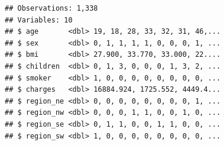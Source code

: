 \documentclass[openany]{book}
\newenvironment{Shaded}{\begin{snugshade}}{\end{snugshade}}
\newcommand{\DataTypeTok}[1]{\textcolor[rgb]{0.13,0.29,0.53}{#1}}
\newcommand{\DecValTok}[1]{\textcolor[rgb]{0.00,0.00,0.81}{#1}}
\newcommand{\FloatTok}[1]{\textcolor[rgb]{0.00,0.00,0.81}{#1}}
\newcommand{\KeywordTok}[1]{\textcolor[rgb]{0.13,0.29,0.53}{\textbf{#1}}}
\newcommand{\NormalTok}[1]{#1}
\newcommand{\OperatorTok}[1]{\textcolor[rgb]{0.81,0.36,0.00}{\textbf{#1}}}
\newcommand{\StringTok}[1]{\textcolor[rgb]{0.31,0.60,0.02}{#1}}
\begin{document}
\begin{Shaded}
\end{Shaded}

\begin{verbatim}
## Observations: 1,338
## Variables: 10
## $ age       <dbl> 19, 18, 28, 33, 32, 31, 46,...
## $ sex       <dbl> 0, 1, 1, 1, 1, 0, 0, 0, 1, ...
## $ bmi       <dbl> 27.900, 33.770, 33.000, 22....
## $ children  <dbl> 0, 1, 3, 0, 0, 0, 1, 3, 2, ...
## $ smoker    <dbl> 1, 0, 0, 0, 0, 0, 0, 0, 0, ...
## $ charges   <dbl> 16884.924, 1725.552, 4449.4...
## $ region_ne <dbl> 0, 0, 0, 0, 0, 0, 0, 0, 1, ...
## $ region_nw <dbl> 0, 0, 0, 1, 1, 0, 0, 1, 0, ...
## $ region_se <dbl> 0, 1, 1, 0, 0, 1, 1, 0, 0, ...
## $ region_sw <dbl> 1, 0, 0, 0, 0, 0, 0, 0, 0, ...
\end{verbatim}

\begin{Shaded}
\end{Shaded}
\end{document}
